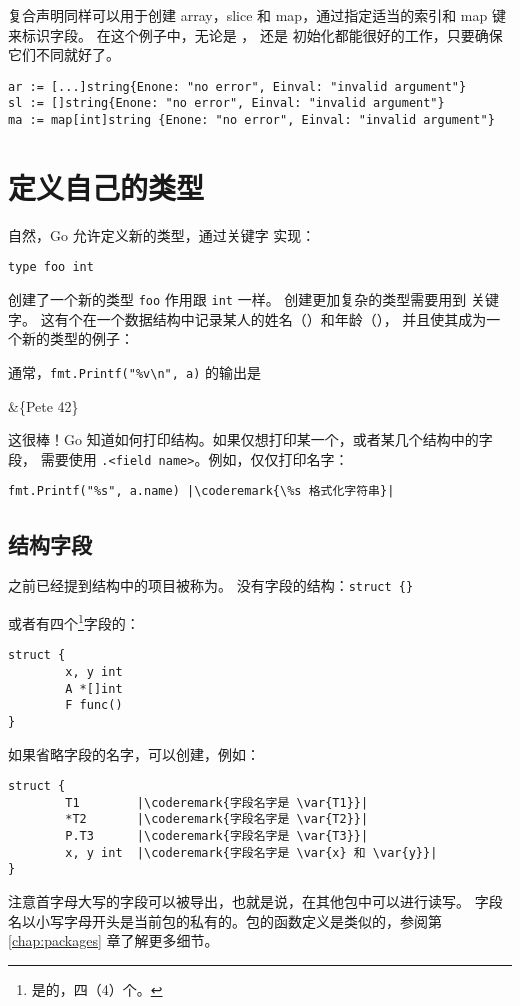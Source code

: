 复合声明同样可以用于创建 array，slice 和 map，通过指定适当的索引和 map 键来标识字段。
在这个例子中，无论是 ， 还是  初始化都能很好的工作，只要确保它们不同就好了。
\begin{lstlisting}
ar := [...]string{Enone: "no error", Einval: "invalid argument"}
sl := []string{Enone: "no error", Einval: "invalid argument"}
ma := map[int]string {Enone: "no error", Einval: "invalid argument"}
\end{lstlisting}

\section{定义自己的类型}
\label{sec:defining your own}
自然，Go 允许定义新的类型，通过关键字
 实现： 
\begin{lstlisting}
type foo int
\end{lstlisting}
创建了一个新的类型 \lstinline{foo} 作用跟 \lstinline{int} 一样。
创建更加复杂的类型需要用到  关键字。
这有个在一个数据结构中记录某人的姓名（）和年龄（），
并且使其成为一个新的类型的例子：

通常，\lstinline{fmt.Printf("%v\n", a)} 的输出是
\begin{display}
&\{Pete 42\}
\end{display}

这很棒！Go 知道如何打印结构。如果仅想打印某一个，或者某几个结构中的字段，
需要使用 \verb|.<field name>|。例如，仅仅打印名字：
\begin{lstlisting}
fmt.Printf("%s", a.name) |\coderemark{\%s 格式化字符串}|
\end{lstlisting}

\subsection{结构字段}
之前已经提到结构中的项目被称为。
没有字段的结构：\lstinline|struct {}|

或者有四个\footnote{是的，四（4）个。}字段的：
\begin{lstlisting}
struct {
        x, y int
        A *[]int
        F func()
}
\end{lstlisting}
如果省略字段的名字，可以创建，例如：
\begin{lstlisting}
struct {
        T1        |\coderemark{字段名字是 \var{T1}}|
        *T2       |\coderemark{字段名字是 \var{T2}}|
        P.T3      |\coderemark{字段名字是 \var{T3}}|
        x, y int  |\coderemark{字段名字是 \var{x} 和 \var{y}}|
}
\end{lstlisting}
注意首字母大写的字段可以被导出，也就是说，在其他包中可以进行读写。
字段名以小写字母开头是当前包的私有的。包的函数定义是类似的，参阅第 \ref{chap:packages} 章了解更多细节。

